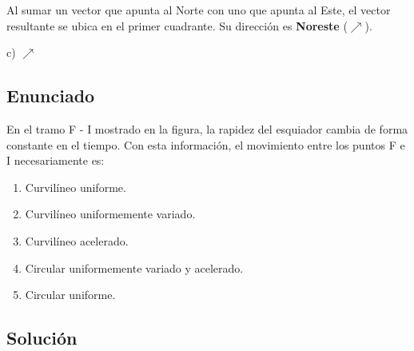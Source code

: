 \documentclass[12pt, a4paper]{article}
\begin{document}
Al sumar un vector que apunta al Norte con uno que apunta al Este, el vector resultante se ubica en el primer cuadrante. Su dirección es \textbf{Noreste} ($\nearrow$).

\begin{tcolorbox}[colback=green!5!white, colframe=green!50!black, title=Respuesta Final]
\centering \Large c) $\nearrow$
\end{tcolorbox}

\newpage

\subsection*{Enunciado}
En el tramo F - I mostrado en la figura, la rapidez del esquiador cambia de forma constante en el tiempo. Con esta información, el movimiento entre los puntos F e I necesariamente es:

\begin{enumerate}[label=\alph*)]
    \item Curvilíneo uniforme.
    \item Curvilíneo uniformemente variado.
    \item Curvilíneo acelerado.
    \item Circular uniformemente variado y acelerado.
    \item Circular uniforme.
\end{enumerate}

\begin{center}
\end{center}

\subsection*{Solución}
\end{document}
